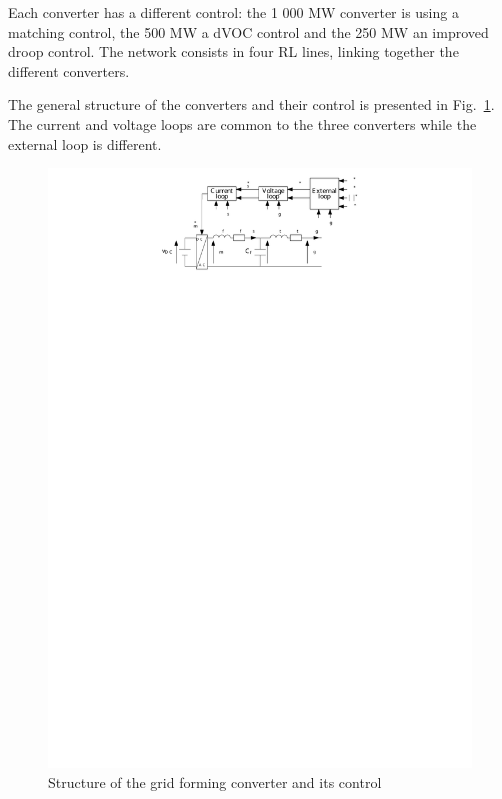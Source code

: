 \documentclass[a4paper, 12pt]{report}
\begin{document}
Each converter has a different control: the 1 000 MW converter is using a matching control, the 500 MW a dVOC control and the 250 MW an improved droop control. The network consists in four RL lines, linking together the different converters.

The general structure of the converters and their control is presented in Fig.~\ref{GFTaoufik}. The current and voltage loops are common to the three converters while the external loop is different.
\begin{figure}[htbp]
\begin{center}
\includegraphics[width=\textwidth]{Schema_Structure_Grid_Forming_and_Control_Taoufik}
\end{center}
\caption{Structure of the grid forming converter and its control\label{GFTaoufik}}
\end{figure}
\end{document}
